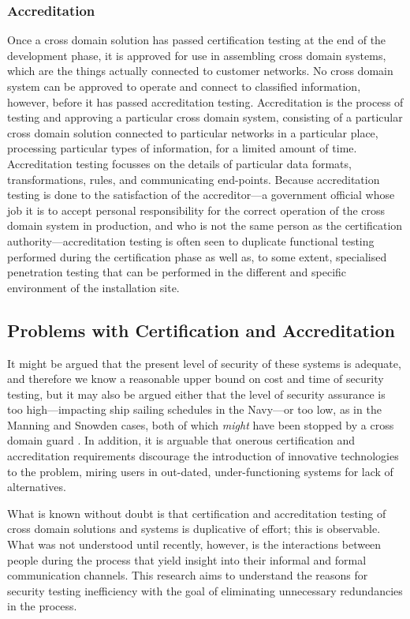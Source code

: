 \documentclass[10pt,letterpaper,conference]{IEEEtran}
\begin{document}
\subsubsection{Accreditation}

Once a cross domain solution has passed certification testing at the end of the development
phase, it is approved for use in assembling cross domain systems, which are the things actually
connected to customer networks. No cross
domain system can be approved to operate and connect to classified information, however, before
it has passed accreditation testing. Accreditation is the process of testing and approving
a particular cross domain system, consisting of a particular cross domain solution connected to
particular networks in a particular place, processing particular types of information, for a
limited amount of time. Accreditation testing focusses on the details of
particular data formats, transformations, rules, and communicating end-points. Because
accreditation testing is done to the satisfaction of the accreditor---a government official whose
job it is to accept personal responsibility for the correct operation of the cross domain system in
production, and who is not the same person as the certification authority---accreditation testing
is often seen to duplicate functional testing performed during the certification phase as well as,
to some extent, specialised penetration testing that can be performed in the different and specific
environment of the installation site.

\subsection{Problems with Certification and Accreditation}

It might be argued that the present level of security of these systems is adequate, and therefore
we know a reasonable upper bound on cost and time of security testing, but it may also be
argued either that the level of security assurance is too high---impacting ship sailing schedules
in the Navy---or too low, as in the Manning and Snowden cases,
both of which \emph{might} have been stopped by a cross domain guard
\cite[Chapter 1]{Loughry2012b}. In addition, it is arguable that onerous certification and
accreditation requirements discourage the introduction of innovative technologies to the problem,
miring users in out-dated, under-functioning systems for lack of alternatives.

What is known without doubt is that certification and accreditation testing of cross domain
solutions and systems is duplicative of effort; this is observable. What was not understood until
recently, however, is the interactions between people during the process that yield insight into
their informal and formal communication channels. This research aims to understand the
reasons for security testing inefficiency with the goal of eliminating unnecessary redundancies in
the process.
\end{document}

